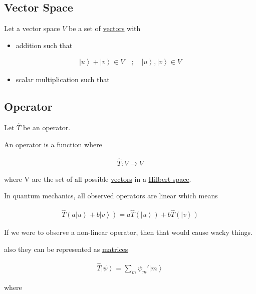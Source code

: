 \documentclass[
]{article}
\providecommand{\tightlist}{%
  \setlength{\itemsep}{0pt}\setlength{\parskip}{0pt}}
\let\oldhyperref\hyperref
\renewcommand{\hyperref}[2][]{\oldhyperref[#1]{\underline{#2}}}
\providecommand{\ket}[1]{\left\lvert #1 \right\rangle}
\providecommand{\rarr}{\rightarrow}
\begin{document}
\subsection{Vector Space}\label{vector-spaces}

Let a vector space \(V\) be a set of \hyperref[vectors]{vectors} with

\begin{itemize}
	\tightlist
	\item
	      addition such that
\end{itemize}

\begin{gather*}
	\ket{u}+\ket{v}\in V\quad ;\quad\ket{u},\ket{v}\in V
\end{gather*}

\begin{itemize}
	\tightlist
	\item
	      scalar multiplication such that
\end{itemize}
\subsection{Operator}\label{operators}

Let \(\hat{T}\) be an operator.

An operator is a
\hyperref[functions]{function}
where

\begin{gather*}
	\hat{T}:V\rarr V
\end{gather*}

where V are the set of all possible \hyperref[vectors]{vectors} in a \hyperref[hilbert-spaces]{Hilbert space}.

In quantum mechanics, all observed operators are linear which means

\begin{gather*}
	\hat{T}(a\ket{u}+b\ket{v})=a\hat{T}(\ket{u})+b\hat{T}(\ket{v})
\end{gather*}

If we were to observe a non-linear operator, then that would cause wacky things.

also they can be represented as \hyperref[matrices]{matrices}

\begin{gather*}
	\hat{T}\ket{\psi}=\sum_{m}\psi_m'\ket{m}
\end{gather*}

where
\end{document}
